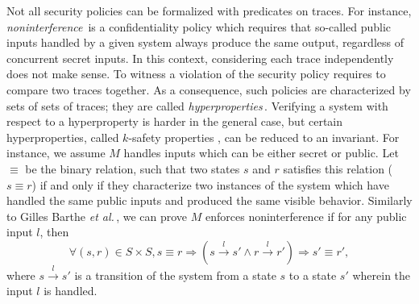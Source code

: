 Not all security policies can be formalized with predicates on traces.
%
For instance, \emph{noninterference}\,\cite{goguen1982security} is a
confidentiality policy which requires that so-called public inputs handled by a
given system always produce the same output, regardless of concurrent secret
inputs.
%
In this context, considering each trace independently does not make sense.
%
To witness a violation of the security policy requires to compare two traces
together.
%
As a consequence, such policies are characterized by sets of sets of traces;
they are called \emph{hyperproperties}\,\cite{marr2002hypertheading}.
%
Verifying a system with respect to a hyperproperty is harder in the general
case, but certain hyperproperties, called \( k \)-safety properties , can be
reduced to an invariant.
%
For instance, we assume \( M \) handles inputs which can be either secret or
public.
%
Let \( \equiv \) be the binary relation, such that two states \( s \) and
\( r \) satisfies this relation (\( s \equiv r \)) if and only if they
characterize two instances of the system which have handled the same public
inputs and produced the same visible behavior.
%
Similarly to Gilles Barthe \emph{et al.}\,\cite{barthe2011virtcert1}, we can
prove \( M \)  enforces noninterference if for any public input \( l \), then
%
\[
  \forall (s, r) \in S \times S, s \equiv r \Rightarrow (s \xrightarrow{l} s'
  \wedge r \xrightarrow{l} r') \Rightarrow s' \equiv r',
\]
where \( s \xrightarrow{l} s' \) is a transition of the system from a state
\( s \) to a state \( s' \) wherein the input \( l \) is handled. 

%

